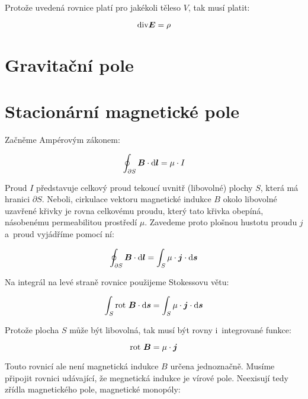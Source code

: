 Protože uvedená rovnice platí pro jakékoli těleso \(V\), tak musí platit:

\begin{equation}
\mathrm{div} \boldsymbol{E} = \rho
\end{equation}

\section{Gravitační pole}

\section{Stacionární magnetické pole}

Začněme Ampérovým zákonem:

\begin{equation}
\oint_{\partial S} \boldsymbol{B} \cdot \mathrm{d}\boldsymbol{l} = \mu \cdot I
\end{equation}

Proud \(I\) představuje celkový proud tekoucí uvnitř (libovolné) plochy \(S\), která má hranici \(\partial S\). Neboli, cirkulace vektoru magnetické indukce \(B\) okolo libovolné uzavřené křivky je rovna celkovému proudu, který tato křivka obepíná, násobenému permeabilitou prostředí \(\mu\). Zavedeme proto plošnou hustotu proudu \(j\) a~proud vyjádříme pomocí ní:

\begin{equation}
\oint_{\partial S} \boldsymbol{B} \cdot \mathrm{d}\boldsymbol{l} = \int_S \mu \cdot \boldsymbol{j} \cdot \mathrm{d}\boldsymbol{s}
\end{equation}

Na integrál na levé straně rovnice použijeme Stokessovu větu:

\begin{equation}
\int_{S} \mathrm{rot} \ \boldsymbol{B} \cdot \mathrm{d}\boldsymbol{s} = \int_S \mu \cdot \boldsymbol{j} \cdot \mathrm{d}\boldsymbol{s}
\end{equation}

Protože plocha \(S\) může být libovolná, tak musí být rovny i~integrované funkce:

\begin{equation}
\mathrm{rot} \ \boldsymbol{B} = \mu \cdot \boldsymbol{j}
\end{equation}

Touto rovnicí ale není magnetická indukce \(B\) určena jednoznačně. Musíme připojit rovnici udávající, že megnetická indukce je vírové pole. Neexisují tedy zřídla magnetického pole, magnetické monopóly:

